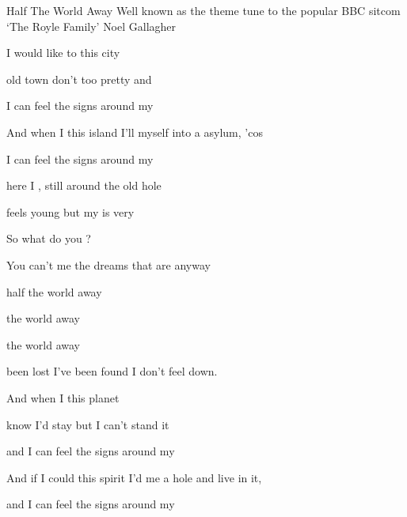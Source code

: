 \begin{SBSong}{Half The World Away}
  {Well known as the theme tune to the popular BBC sitcom `The Royle Family'}
  {Noel Gallagher}
  \begin{SBVerse}
     I would like to  this city
    
     old town don't  too pretty and 
    
     I can feel the  signs  around my  
    
     And when I  this island I'll  myself into a  asylum, 'cos
    
     I can feel the  signs  around my  
  \end{SBVerse}
  \begin{SBChorus}
     here I , still  around the  old hole 
    
     feels young but my  is very  
    
     So what do you ? 
    
    You can't  me the dreams that are  anyway 
    
     half the world away 
    
     the world away 
    
     the world away 
    
     been lost I've been found  I don't feel down.  
  \end{SBChorus}
  \begin{SBVerse}
     And when I  this planet
    
     know I'd stay but I  can't stand it 
    
     and I can feel the  signs  around my 
    
     And if I could  this spirit I'd  me a hole and  live in it,
    
    and  I can feel the  signs  around my 
  \end{SBVerse}
\end{SBSong}